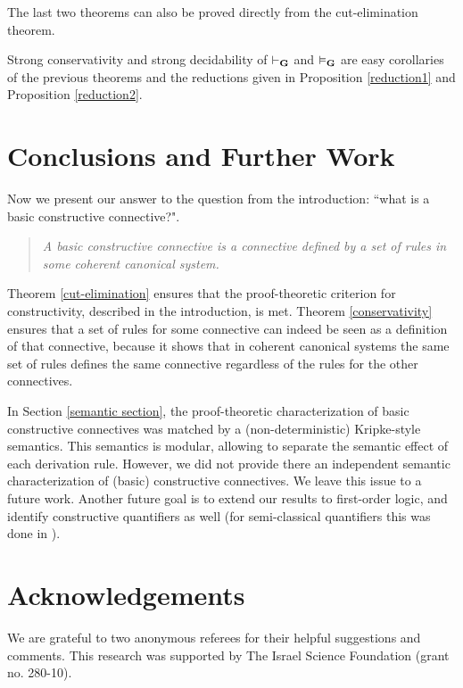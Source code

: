 \documentclass{LMCS}
\theoremstyle{remark}
\newcommand{\G}{{\bf G}}
\newcommand{\vd}{\vdash}
\newcommand{\vD}{\vDash}
\begin{document}
\begin{enumerate}[(a)]
\begin{enumerate}[\bf(a):]
\begin{rem}
The last two theorems can also be proved directly 
from the cut-elimination theorem.
\end{rem}

Strong conservativity and strong decidability of $\vd_{\G}$ and $\vD_{\G}$ 
are easy corollaries of the previous theorems and the reductions given in 
Proposition \ref{reduction1} and Proposition \ref{reduction2}.

\section{Conclusions and Further Work}

Now we present our answer to the question from the introduction:
``what is a basic constructive connective?".

\smallskip
\begin{quote}
{\em A basic constructive connective is a connective 
defined by a set of rules in some coherent canonical system.}
\end{quote}

\smallskip\noindent
Theorem \ref{cut-elimination} ensures that the proof-theoretic criterion for constructivity, described in the
introduction, is met. Theorem \ref{conservativity}
ensures that a set of rules for some connective can indeed be seen as a definition of that connective, 
because it shows that in coherent canonical systems the same set of rules defines the same connective
regardless of the rules for the other connectives.



In Section \ref{semantic section}, the proof-theoretic characterization of basic constructive connectives 
was matched by a (non-deterministic) Kripke-style semantics. This semantics is modular, allowing to separate
the semantic effect of each derivation rule. However, we did not provide there
an independent semantic characterization
of (basic) constructive connectives. 
We leave this issue to a future work.
Another future goal is to extend our results to first-order logic, 
and identify constructive quantifiers as well
(for semi-classical quantifiers this was done in \cite{AZ08}).

\section*{Acknowledgements}
We are grateful to two anonymous referees for their helpful suggestions
and comments.
This research was supported by The Israel Science Foundation (grant no. 280-10).



\end{enumerate}
\end{enumerate}
\end{document}
